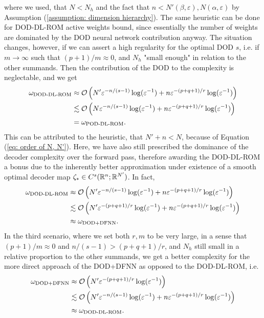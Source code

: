 where we used, that $N < N_h$ and the fact that $n < N'(\beta, \varepsilon), N(\alpha, \varepsilon)$
by Assumption (\ref{assumption: dimension hierarchy}). The 
same heuristic can be done for DOD-DL-ROM active weights bound, since essentially the number of weights are
dominated by the DOD neural network contribution anyway. The situation changes, however, if we can 
assert a high regularity for the optimal DOD $s$, i.e. if $m \to \infty$ such that $(p+1)/m \approx 0$,
and $N_h$ "small enough" in relation to the other summands. 
Then the contribution of 
the DOD to the complexity is neglectable, and we get
\begin{align*}
    \omega_\text{DOD-DL-ROM} &\approx \mathcal{O}\left(N' \varepsilon^{-n/(s-1)} \log(\varepsilon^{-1})
    + n \varepsilon^{-(p+q+1)/r} \log(\varepsilon^{-1})\right) \\
    &\lesssim \mathcal{O}\left(N \varepsilon^{-n/(s-1)} \log(\varepsilon^{-1}) 
    + n \varepsilon^{-(p+q+1)/r} \log(\varepsilon^{-1})\right) \\
    &= \omega_\text{POD-DL-ROM}.
\end{align*}
This can be attributed to the heuristic, that $N' + n < N$, because of Equation (\ref{eq: order of N, N'}).
Here, we have also still prescribed the dominance of the decoder complexity over the forward pass,
therefore awarding the DOD-DL-ROM a bonus due to the inherently better approximation under existence of a smooth
optimal decoder map $\zeta_* \in C^s(\mathbb{R}^n; \mathbb{R}^{N'})$. In fact,
\begin{align*}
    \omega_\text{DOD-DL-ROM} &\approx \mathcal{O}\left(N' \varepsilon^{-n/(s-1)} \log(\varepsilon^{-1})
    + n \varepsilon^{-(p+q+1)/r} \log(\varepsilon^{-1})\right) \\
    &\lesssim \mathcal{O}\left(N' \varepsilon^{-(p+q+1)/r} \log(\varepsilon^{-1}) 
    + n \varepsilon^{-(p+q+1)/r} \log(\varepsilon^{-1})\right) \\
    &\approx \omega_\text{DOD+DFNN}.
\end{align*}
In the third scenario, where we set both $r, m$ to be very large, in a sense that
$(p+1)/m \approx 0$ and $n/(s-1) > (p+q+1)/r$, and $N_h$ still small in a relative
proportion to the other summands, we get a better complexity for the more
direct approach of the DOD+DFNN as opposed to the DOD-DL-ROM, i.e.
\begin{align*}
    \omega_\text{DOD+DFNN} &\approx \mathcal{O}\left(N' \varepsilon^{-(p+q+1)/r} \log(\varepsilon^{-1})\right) \\
    &\lesssim \mathcal{O}\left(N' \varepsilon^{-n/(s-1)} \log(\varepsilon^{-1})
    + n \varepsilon^{-(p+q+1)/r} \log(\varepsilon^{-1})\right) \\
    &\approx \omega_\text{DOD-DL-ROM}.
\end{align*}
